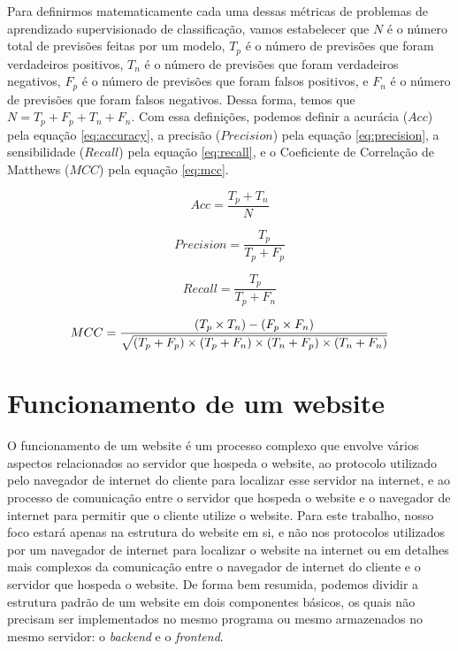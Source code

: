 Para definirmos matematicamente cada uma dessas métricas de problemas de aprendizado supervisionado de classificação, vamos estabelecer que $N$ é o número total de previsões feitas por um modelo, $T_{p}$ é o número de previsões que foram verdadeiros positivos, $T_{n}$ é o número de previsões que foram verdadeiros negativos, $F_{p}$ é o número de previsões que foram falsos positivos, e $F_{n}$ é o número de previsões que foram falsos negativos. Dessa forma, temos que $N = T_{p} + F_{p} + T_{n} + F_{n}$. Com essa definições, podemos definir a acurácia ($Acc$) pela equação \ref{eq:accuracy}, a precisão ($Precision$) pela equação \ref{eq:precision}, a sensibilidade ($Recall$) pela equação \ref{eq:recall}, e o Coeficiente de Correlação de Matthews ($MCC$) pela equação \ref{eq:mcc}.

\begin{equation} \label{eq:accuracy}
  Acc = \frac{T_{p} + T_{n}}{N}
\end{equation}

\begin{equation} \label{eq:precision}
  Precision = \frac{T_{p}}{T_{p} + F_{p}}
\end{equation}

\begin{equation} \label{eq:recall}
  Recall = \frac{T_{p}}{T_{p} + F_{n}}
\end{equation}

\begin{equation} \label{eq:mcc}
  MCC = \frac{(T_{p} \times T_{n}) - (F_{p} \times F_{n})}{ \\
    \sqrt{ \\
      (T_{p} + F_{p}) \times (T_{p} + F_{n}) \times (T_{n} + F_{p}) \\
      \times (T_{n} + F_{n}) \\
    } \\
  }
\end{equation}

\section{Funcionamento de um website}

O funcionamento de um website é um processo complexo que envolve vários aspectos relacionados ao servidor que hospeda o website, ao protocolo utilizado pelo navegador de internet do cliente para localizar esse servidor na internet, e ao processo de comunicação entre o servidor que hospeda o website e o navegador de internet para permitir que o cliente utilize o website. Para este trabalho, nosso foco estará apenas na estrutura do website em si, e não nos protocolos utilizados por um navegador de internet para localizar o website na internet ou em detalhes mais complexos da comunicação entre o navegador de internet do cliente e o servidor que hospeda o website. De forma bem resumida, podemos dividir a estrutura padrão de um website em dois componentes básicos, os quais não precisam ser implementados no mesmo programa ou mesmo armazenados no mesmo servidor: o \textit{backend} e o \textit{frontend}.

